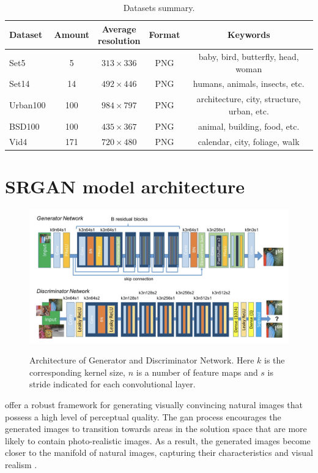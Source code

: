 \documentclass[conference]{IEEEtran}
\begin{document}
\begin{table}[!htb]
    \centering
    \caption{Datasets summary.}
    \label{tab:datasets}
	\begin{tabular}{|l|c|c|c|c|}
	\hline
	Dataset  & Amount & \makecell{Average\\resolution} & Format & Keywords  \\ \hline
	Set5     & 5      & $313 \times 336$   & PNG    & baby, bird, butterfly, head, woman \\ \hline
	Set14    & 14     & $492 \times 446$   & PNG    & humans, animals, insects, etc. \\ \hline
	Urban100 & 100    & $984 \times 797$   & PNG    & architecture, city, structure, urban, etc. \\ \hline
	BSD100   & 100    & $435 \times 367$   & PNG    & animal, building, food, etc. \\ \hline
	Vid4     & 171    & $720 \times 480$   & PNG    &  calendar, city, foliage, walk \\ \hline
\end{tabular}
\end{table}

\section{SRGAN model architecture\label{sec:srgan_arhitecture}}

\begin{figure}[!htb]
	\centering
	\includegraphics[scale=0.5]{srgan_model}\\
	\caption{Architecture of Generator and Discriminator Network. Here $k$ is the corresponding kernel size, $n$ is a number of feature maps and $s$ is stride indicated for each convolutional layer.}
	\label{fig:srgan_model}
\end{figure}

 offer a robust framework for generating visually convincing natural images that possess a high level of perceptual quality. The \acrshort{gan} process encourages the generated images to transition towards areas in the solution space that are more likely to contain photo-realistic images. As a result, the generated images become closer to the manifold of natural images, capturing their characteristics and visual realism \cite{goodfellow2014generative}.
\end{document}
